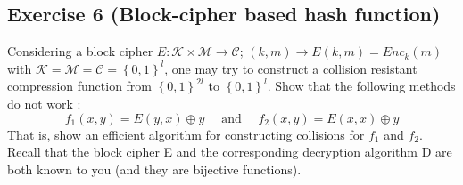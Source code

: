 \subsection{Exercise 6 (Block-cipher based hash function)}
Considering a block cipher
$E:\mathcal{K}\times\mathcal{M}\rightarrow\mathcal{C}$; $(k,m)\rightarrow E(k,m)=Enc_k(m)$
with $\mathcal{K}=\mathcal{M}=\mathcal{C}=\left\{0,1\right\}^l$, one may try to construct
a collision resistant compression function from $\left\{0,1\right\}^{2l}$ to $\left\{0,1\right\}^{l}$.
Show that the following methods do not work :
$$ f_1(x,y)=E(y,x)\oplus y \quad\mbox{ and }\quad f_2(x,y)=E(x,x)\oplus y $$
That is, show an efficient algorithm for constructing collisions for $f_1$ and $f_2$.
Recall that the block cipher E and the corresponding decryption algorithm D are both
known to you (and they are bijective functions).
